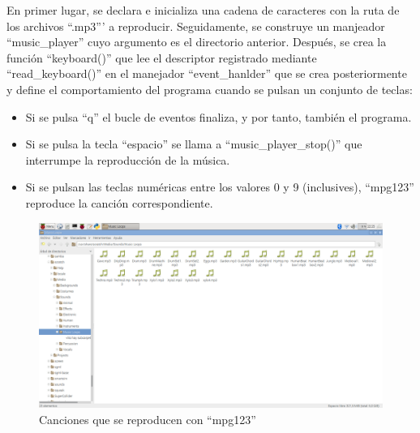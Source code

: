 \begin{itemize}

    
    En primer lugar, se declara e inicializa una cadena de caracteres con la ruta de los archivos ``.mp3''' a reproducir. Seguidamente, se construye un manjeador ``music\_player'' cuyo argumento es el directorio anterior. Después, se crea la función ``keyboard()'' que lee el descriptor registrado mediante ``read\_keyboard()'' en el manejador ``event\_hanlder'' que se crea posteriormente y define el comportamiento del programa cuando se pulsan un conjunto de teclas:
    
    \begin{itemize}
        \item Si se pulsa ``q'' el bucle de eventos finaliza, y por tanto, también el programa.
        \item Si se pulsa la tecla ``espacio'' se llama a ``music\_player\_stop()'' que interrumpe la reproducción de la música.
        \item Si se pulsan las teclas numéricas entre los valores 0 y 9 (inclusives), ``mpg123'' reproduce la canción correspondiente.
    \end{itemize}
    
    \begin{figure}
    \centering
    \includegraphics[scale = 0.25]{anexo_a/figuras_dir/musica.jpg}
    \caption{Canciones que se reproducen con ``mpg123''}
    \end{figure}
  
\end{itemize}
